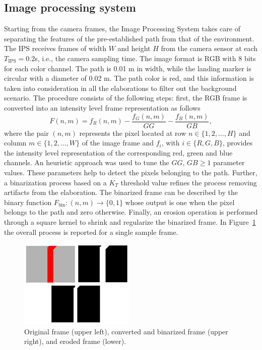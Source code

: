\documentclass[a4paper,twocolumn,10pt]{article}
\begin{document}
    \subsection{Image processing system}
    \label{sec:imageProcessingSystem}

    Starting from the camera frames, the Image Processing System takes care of separating the features of the 
    pre-established path from that of the environment.
    The IPS receives frames of width $W$ and height $H$ from the camera sensor at each   
    $T_\mathrm{IPS} = 0.2$s, i.e., the camera sampling time. The image format is RGB with 
    $8$ bits for each color channel. The path is 0.01 m in width, while the landing marker 
    is circular with a diameter of 0.02 m. The path color is red, and this information is 
    taken into consideration in all the elaborations to filter out the background scenario. The 
    procedure consists of the following steps: first, the RGB frame is converted into an intensity 
    level frame representation as follows 
    \begin{equation}
        F(n,m)=f_R(n,m) -  \frac{f_G(n,m)}{GG} - \frac{f_B(n,m)}{GB} ,
    \end{equation}
    where the pair $(n,m)$ represents the pixel located at row $n \in \{1, 2, \dots, H\}$ and column $m 
    \in \{1, 2, \dots, W\}$ of the image frame and $f_i$, with $i \in \{R, G, B\}$, provides the intensity level representation of the corresponding red, green and blue channels. An heuristic 
    approach was used to tune the $GG$, $GB \geq 1$ parameter values. These parameters help to detect the pixels belonging to the path. Further, a binarization process based on a $K_T$  threshold value refines the process removing artifacts from the elaboration. The binarized frame can be described by the binary 
    function $F_\mathrm{bin} \colon (n,m) \to \{0, 1\}$ whose output is one when the pixel belongs to the path and zero otherwise. Finally, an erosion operation is performed through a 
    square kernel to shrink and regularize the binarized frame. In Figure~\ref{fig:fig6frames} the overall process is reported for a single sample frame.

    \begin{figure}
        \centering
        \includegraphics[width=0.49\textwidth]{pics/fig6_track.jpg}
        \caption{Original frame (upper left),  converted and binarized frame (upper right), and eroded frame (lower).}
        \label{fig:fig6frames}
    \end{figure}
\end{document}
